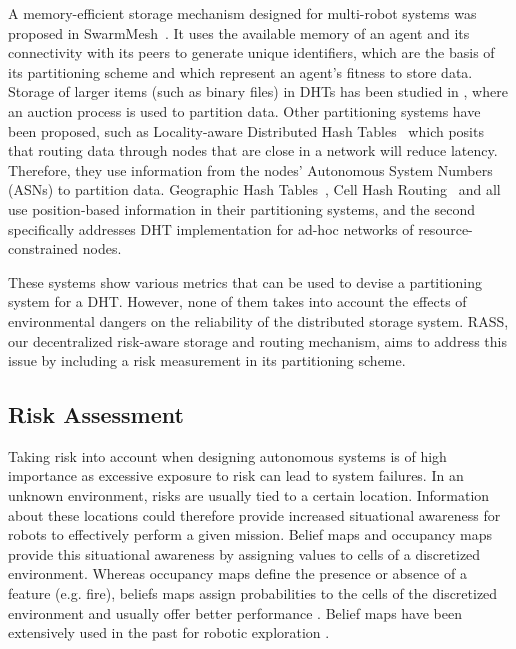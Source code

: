 \documentclass[letterpaper, 10 pt, conference]{ieeeconf}
\begin{document}
A memory-efficient storage mechanism designed for multi-robot systems
was proposed in SwarmMesh~\cite{majcherczykSwarmmesh2020}. It
uses the available memory of an agent and its connectivity with its
peers to generate unique identifiers, which are the basis of its
partitioning scheme and which represent an agent's fitness to store
data. Storage of larger items (such as binary files) in DHTs has been
studied in \cite{varadharajan2020soul}, where an auction process is
used to partition data.  Other partitioning systems have been
proposed, such as Locality-aware Distributed Hash
Tables~\cite{wu2008ldht} which posits that routing data through nodes
that are close in a network will reduce latency. Therefore, they use
information from the nodes' Autonomous System Numbers (ASNs) to
partition data.  Geographic Hash Tables~\cite{ratnasamy2002ght}, Cell
Hash Routing~\cite{araujo2005chr} and \cite{ahullo2008supporting} all
use position-based information in their partitioning systems, and the
second specifically addresses DHT implementation for ad-hoc networks
of resource-constrained nodes.

These systems show various metrics that can be used to devise a
partitioning system for a DHT. However, none of them takes into
account the effects of environmental dangers on the reliability of the
distributed storage system. RASS, our decentralized risk-aware storage and routing mechanism, aims to address this issue by including
a risk measurement in its partitioning scheme.

\subsection{Risk Assessment}

Taking risk into account when designing autonomous systems is of high
importance as excessive exposure to risk can lead to system
failures. In an unknown environment, risks are usually
tied to a certain location. Information about these locations could therefore
provide increased situational awareness for robots to effectively
perform a given mission. Belief maps and occupancy maps provide this
situational awareness by assigning values to cells of a discretized
environment. Whereas occupancy maps define the presence or absence of
a feature (e.g. fire), beliefs maps assign probabilities to the cells
of the discretized environment and usually offer better performance
\cite{stachnissMappingExplorationMobile2003}. Belief maps have been
extensively used in the past for robotic exploration
\cite{kobayashiSharingExploringInformation2002,
  kobayashiDeterminationExplorationTarget2003,
  indelmanCooperativeMultirobotBelief2018}.
\end{document}
